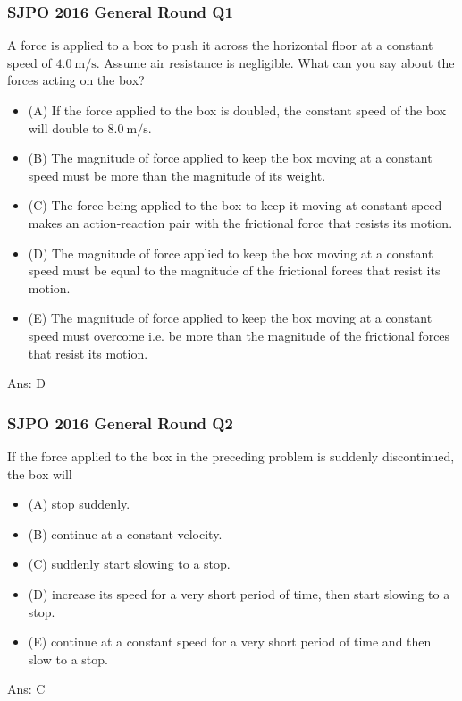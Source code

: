 \documentclass{article}
\begin{document}
\subsubsection{SJPO 2016 General Round Q1}
A force is applied to a box to push it across the horizontal floor at a constant speed of $4.0 \mathrm{~m} / \mathrm{s}$. Assume air resistance is negligible. What can you say about the forces acting on the box?
\begin{itemize}
\item[] (A) If the force applied to the box is doubled, the constant speed of the box will double to $8.0 \mathrm{~m} / \mathrm{s}$.
\item[] (B) The magnitude of force applied to keep the box moving at a constant speed must be more than the magnitude of its weight.
\item[] (C) The force being applied to the box to keep it moving at constant speed makes an action-reaction pair with the frictional force that resists its motion.
\item[] (D) The magnitude of force applied to keep the box moving at a constant speed must be equal to the magnitude of the frictional forces that resist its motion.
\item[] (E) The magnitude of force applied to keep the box moving at a constant speed must overcome i.e. be more than the magnitude of the frictional forces that resist its motion.
\end{itemize}
Ans: \ifpaper D \fi

\subsubsection{SJPO 2016 General Round Q2}
If the force applied to the box in the preceding problem is suddenly discontinued, the box will
\begin{itemize}
\item[] (A) stop suddenly.
\item[] (B) continue at a constant velocity.
\item[] (C) suddenly start slowing to a stop.
\item[] (D) increase its speed for a very short period of time, then start slowing to a stop.
\item[] (E) continue at a constant speed for a very short period of time and then slow to a stop.
\end{itemize}
Ans: \ifpaper C \fi
\end{document}
